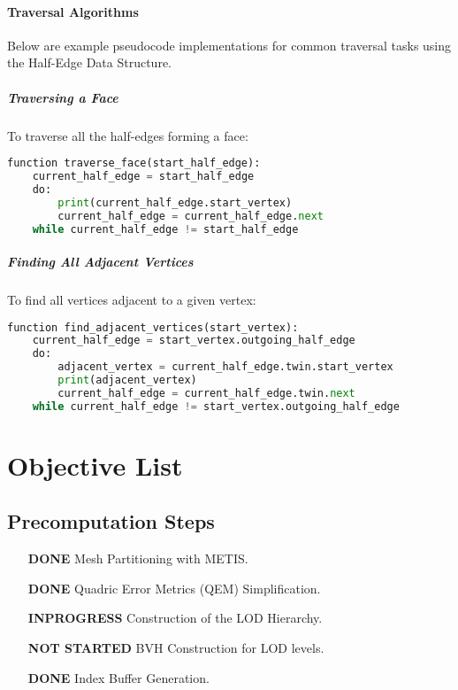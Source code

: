 \documentclass[12pt]{extarticle}
\begin{document}
\paragraph{Traversal Algorithms}
Below are example pseudocode implementations for common traversal tasks using the Half-Edge Data Structure.

\subparagraph{Traversing a Face}
To traverse all the half-edges forming a face:
\begin{lstlisting}[language=Python, caption={Pseudocode for traversing a face.}]
function traverse_face(start_half_edge):
    current_half_edge = start_half_edge
    do:
        print(current_half_edge.start_vertex)
        current_half_edge = current_half_edge.next
    while current_half_edge != start_half_edge
\end{lstlisting}
\newpage
\subparagraph{Finding All Adjacent Vertices}
To find all vertices adjacent to a given vertex:
\begin{lstlisting}[language=Python, caption={Pseudocode for finding adjacent vertices.}]
function find_adjacent_vertices(start_vertex):
    current_half_edge = start_vertex.outgoing_half_edge
    do:
        adjacent_vertex = current_half_edge.twin.start_vertex
        print(adjacent_vertex)
        current_half_edge = current_half_edge.twin.next
    while current_half_edge != start_vertex.outgoing_half_edge
\end{lstlisting}


\section{Objective List}
\subsection{Precomputation Steps}
\begin{enumerate}
    \item [\textbf{DONE}] Mesh Partitioning with METIS.
    \item [\textbf{DONE}] Quadric Error Metrics (QEM) Simplification.
    \item [\textbf{INPROGRESS}] Construction of the LOD Hierarchy.
    \item [\textbf{NOT STARTED}] BVH Construction for LOD levels.
    \item [\textbf{DONE}] Index Buffer Generation.
\end{enumerate}
\end{document}
